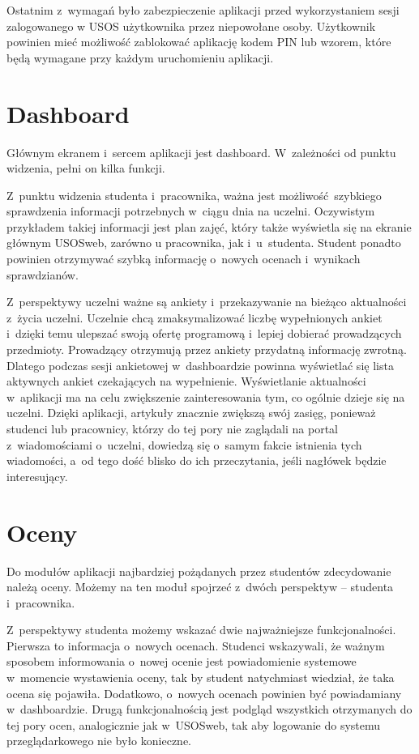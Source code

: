 \documentclass{pracamgr}
\begin{document}
Ostatnim z~wymagań było zabezpieczenie aplikacji przed wykorzystaniem sesji zalogowanego
w USOS użytkownika przez niepowołane osoby. Użytkownik powinien mieć możliwość zablokować
aplikację kodem PIN lub wzorem, które będą wymagane przy każdym uruchomieniu aplikacji.

\section{Dashboard}

Głównym ekranem i~sercem aplikacji jest dashboard. W~zależności od punktu widzenia, pełni
on kilka funkcji.

Z~punktu widzenia studenta i~pracownika, ważna jest możliwość szybkiego sprawdzenia informacji
potrzebnych w~ciągu dnia na uczelni. Oczywistym przykładem takiej informacji jest plan zajęć,
który także wyświetla się na ekranie głównym USOSweb, zarówno u pracownika, jak i~u~studenta.
Student ponadto powinien otrzymywać szybką informację o~nowych ocenach i~wynikach sprawdzianów.

Z~perspektywy uczelni ważne są ankiety i~przekazywanie na bieżąco aktualności z~życia
uczelni. Uczelnie chcą zmaksymalizować liczbę
wypełnionych ankiet i~dzięki temu ulepszać swoją ofertę programową i~lepiej dobierać
prowadzących przedmioty. Prowadzący otrzymują przez ankiety przydatną informację zwrotną.
Dlatego podczas sesji ankietowej w~dashboardzie powinna wyświetlać się lista aktywnych
ankiet czekających na wypełnienie. Wyświetlanie aktualności w~aplikacji ma na
celu zwiększenie zainteresowania tym,
co ogólnie dzieje się na uczelni. Dzięki aplikacji, artykuły znacznie zwiększą swój zasięg,
ponieważ studenci lub pracownicy, którzy do tej pory nie zaglądali na portal z~wiadomościami
o~uczelni, dowiedzą się o~samym fakcie istnienia tych wiadomości, a~od tego dość blisko do
ich przeczytania, jeśli nagłówek będzie interesujący.

\section{Oceny}

Do modułów aplikacji najbardziej pożądanych przez studentów zdecydowanie należą oceny.
Możemy na ten moduł spojrzeć z~dwóch perspektyw -- studenta i~pracownika.

Z~perspektywy studenta możemy wskazać dwie najważniejsze funkcjonalności. Pierwsza to
informacja o~nowych ocenach. Studenci wskazywali, że ważnym sposobem informowania o~nowej
ocenie jest powiadomienie systemowe w~momencie wystawienia oceny, tak by student natychmiast
wiedział, że taka ocena się pojawiła. Dodatkowo, o~nowych ocenach powinien być powiadamiany
w~dashboardzie. Drugą funkcjonalnością jest podgląd wszystkich otrzymanych do tej pory ocen,
analogicznie jak w~USOSweb, tak aby logowanie do systemu przeglądarkowego nie było konieczne.
\end{document}
